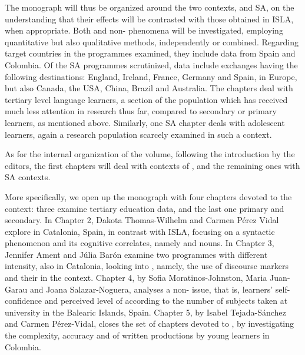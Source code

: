 \documentclass[output=paper]{langsci/langscibook}
\begin{document}
The monograph will thus be organized around the two contexts,  and SA, on the understanding that their effects will be contrasted with those obtained in ISLA, when appropriate. Both  and non- phenomena will be investigated, employing quantitative but also qualitative methods, independently or combined. Regarding target countries in the  programmes examined, they include data from Spain and Colombia. Of the SA programmes scrutinized, data include exchanges having the following destinations: England, Ireland, France, Germany and Spain, in Europe, but also Canada, the USA, China, Brazil and Australia. The  chapters deal with tertiary level language learners, a section of the population which has received much less attention in research thus far, compared to secondary or primary learners, as mentioned above. Similarly, one SA chapter deals with adolescent learners, again a research population scarcely examined in such a context.

\largerpage
As for the internal organization of the volume, following the introduction by the editors, the first chapters will deal with  contexts of , and the remaining ones with SA contexts. 


More specifically, we open up the monograph with four chapters devoted to the  context: three examine tertiary education data, and the last one primary and secondary. In Chapter 2, Dakota Thomas-Wilhelm and Carmen Pérez Vidal explore  in Catalonia, Spain, in contrast with ISLA, focusing on a syntactic phenomenon and its cognitive correlates, namely   and  nouns. In Chapter 3, Jennifer Ament and Júlia Barón examine two  programmes with different intensity, also in Catalonia, looking into , namely, the use of  discourse markers and their  in the  context. Chapter 4, by Sofia Moratinos-Johnston, Maria Juan-Garau and Joana Salazar-Noguera, analyses a non- issue, that is, learners’  self-confidence and perceived level of  according to the number of  subjects taken at university in the Balearic Islands, Spain. Chapter 5, by Isabel Tejada-Sánchez and Carmen Pérez-Vidal, closes the set of chapters devoted to , by investigating the complexity, accuracy and  of written productions by young   learners in Colombia.
\end{document}
